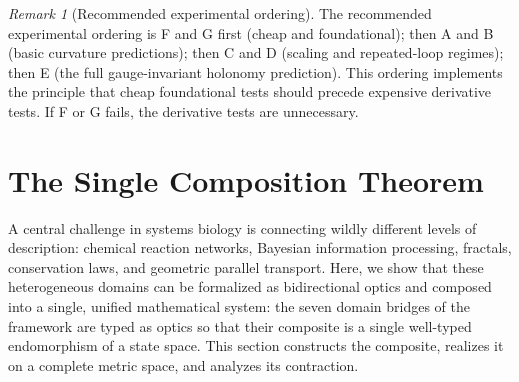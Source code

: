 \documentclass[11pt,a4paper]{article}
\theoremstyle{plain}
\theoremstyle{definition}
\theoremstyle{remark}
\newtheorem{remark}[theorem]{Remark}
\begin{document}
\begin{remark}[Recommended experimental ordering]
\label{rem:ordering}
The recommended experimental ordering is F and G first (cheap and
foundational); then A and B (basic curvature predictions); then C and
D (scaling and repeated-loop regimes); then E (the full gauge-invariant
holonomy prediction). This ordering implements the principle that cheap
foundational tests should precede expensive derivative tests. If F or G
fails, the derivative tests are unnecessary.
\end{remark}


\section{The Single Composition Theorem}\label{sec:composition}

A central challenge in systems biology is connecting wildly
different levels of description: chemical reaction networks,
Bayesian information processing, fractals, conservation laws, and
geometric parallel transport. Here, we show that these
heterogeneous domains can be formalized as bidirectional optics and
composed into a single, unified mathematical system: the seven
domain bridges of the framework are typed as optics so that their
composite is a single well-typed endomorphism of a state space.
This section constructs the composite, realizes it on a complete
metric space, and analyzes its contraction.
\end{document}
